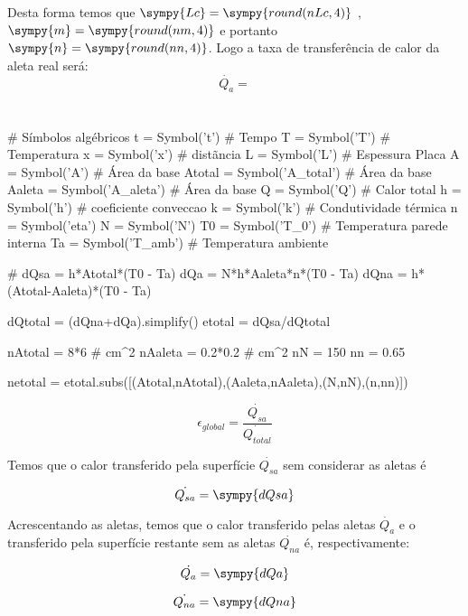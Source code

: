 \documentclass[a4paper,11pt]{article}
\newcommand{\npy}[1]{\sympy{round(n#1,4)}}
\begin{document}
Desta forma temos que $\sympy{Lc} =\npy{Lc}$ , $\sympy{m} =\npy{m}$ e portanto $\sympy{n} =\npy{n}$. Logo a taxa de transferência de calor da aleta real será:
$$
\dot{Q_{a}} = 
$$

\section{}

\begin{sympycode}
# Símbolos algébricos
t = Symbol('t') # Tempo
T = Symbol('T') # Temperatura
x = Symbol('x') # distãncia
L = Symbol('L') # Espessura Placa
A = Symbol('A') # Área da base
Atotal = Symbol('A_total') # Área da base
Aaleta = Symbol('A_aleta') # Área da base
Q = Symbol('Q') # Calor total
h = Symbol('h') # coeficiente conveccao
k = Symbol('k') # Condutividade térmica
n = Symbol('eta')
N = Symbol('N')
T0 = Symbol('T_0') # Temperatura parede interna
Ta = Symbol('T_amb') # Temperatura ambiente

#
dQsa = h*Atotal*(T0 - Ta)
dQa = N*h*Aaleta*n*(T0 - Ta)
dQna = h*(Atotal-Aaleta)*(T0 - Ta)

dQtotal = (dQna+dQa).simplify()
etotal = dQsa/dQtotal

nAtotal = 8*6 # cm^2
nAaleta = 0.2*0.2 # cm^2
nN = 150
nn = 0.65

netotal = etotal.subs([(Atotal,nAtotal),(Aaleta,nAaleta),(N,nN),(n,nn)])

\end{sympycode}

\begin{equation}\label{eq:eglobal}
\epsilon_{global} = \frac{\dot{Q_{sa}}}{\dot{Q_{total}}}
\end{equation}

Temos que o calor transferido pela superfície $\dot{Q_{sa}}$ sem considerar as aletas é

\begin{equation}\label{eq:dq_sa}
\dot{Q_{sa}} = \sympy{dQsa}
\end{equation}

Acrescentando as aletas, temos que o calor transferido pelas aletas $\dot{Q_{a}}$ e o transferido pela superfície restante sem as aletas $\dot{Q_{na}}$ é, respectivamente:

\begin{equation}\label{eq:dq_a}
\dot{Q_{a}} = \sympy{dQa}
\end{equation}

\begin{equation}\label{eq:dq_na}
\dot{Q_{na}} = \sympy{dQna}
\end{equation}
\end{document}

